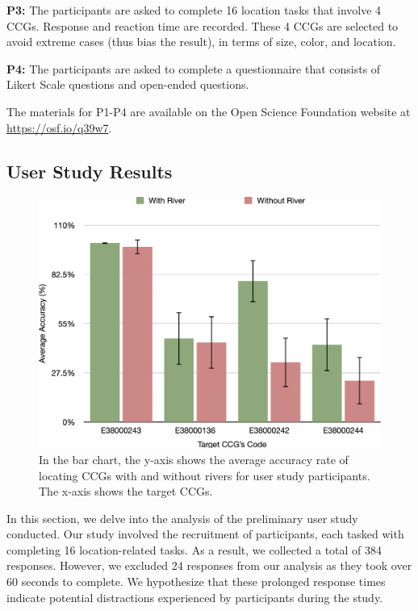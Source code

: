 \textbf{P3:} The participants are asked to complete 16 location tasks that involve 4 CCGs. Response and reaction time are recorded. These 4 CCGs are selected to avoid extreme cases (thus bias the result), in terms of size, color, and location.

\textbf{P4:} The participants are asked to complete a questionnaire that consists of Likert Scale questions and open-ended questions.

The materials for P1-P4 are available on the Open Science Foundation website at \url{https://osf.io/q39w7}.

\subsection{User Study Results}
\label{subsec:{User Study Results}}

{
    \begin{figure}[b!]
        \centering
        \includegraphics[width=\columnwidth,keepaspectratio]{figure/evaluation/accuracy.png}
        \caption{In the bar chart, the y-axis shows the average accuracy rate of locating CCGs with and without rivers for user study participants. The x-axis shows the target CCGs.}
        \label{fig:task-acc}
    \end{figure}
}


In this section, we delve into the analysis of the preliminary user study conducted. Our study involved the recruitment of \pCount participants, each tasked with completing 16 location-related tasks. As a result, we collected a total of 384 responses. However, we excluded 24 responses from our analysis as they took over 60 seconds to complete. We hypothesize that these prolonged response times indicate potential distractions experienced by participants during the study.

